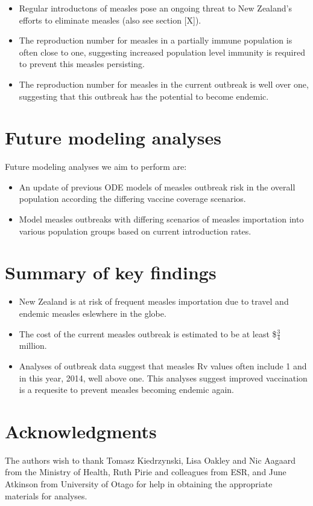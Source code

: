 \documentclass{article}
\begin{document}
\begin{itemize}
\item Regular introductons of measles pose an ongoing threat to New Zealand's efforts to eliminate measles (also see section [X]).
\item The reproduction number for measles in a partially immune population is often close to one, suggesting increased population level immunity is required to prevent this measles persisting.
 \item The reproduction number for measles in the current outbreak is well over one, suggesting that this outbreak has the potential to become endemic.
\end{itemize}

\section{Future modeling analyses}
Future modeling analyses we aim to perform are:
\begin{itemize}
\item An update of previous ODE models of measles outbreak risk in the overall population according the differing vaccine coverage scenarios.
\item Model measles outbreaks with differing scenarios of measles importation into various population groups based on current introduction rates.
\end{itemize}

\section {Summary of key findings}
\begin{itemize}
\item New Zealand is at risk of frequent measles importation due to travel and endemic measles eslewhere in the globe.
\item The cost of the current measles outbreak is estimated to be at least \$$\frac{3}{4}$ million.
\item Analyses of outbreak data suggest that measles Rv values often include 1 and in this year, 2014, well above one. This analyses suggest improved vaccination is a requesite to prevent measles becoming endemic again.
\end{itemize}

\section{Acknowledgments}
The authors wish to thank Tomasz Kiedrzynski, Lisa Oakley and Nic Aagaard from the Ministry of Health, Ruth Pirie and colleagues from ESR, and June Atkinson from University of Otago for help in obtaining the appropriate materials for analyses.
\end{document}
